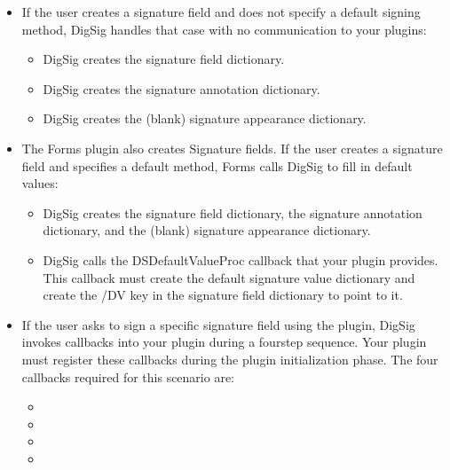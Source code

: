 \documentclass[letterpaper,12pt,english,openany,oneside]{sphinxmanual}
\begin{document}
\begin{itemize}
\item {} 
If the user creates a signature field and does not specify a default signing method, DigSig handles that case with no communication to your plugins:
\begin{itemize}
\item {} 
DigSig creates the signature field dictionary.

\item {} 
DigSig creates the signature annotation dictionary.

\item {} 
DigSig creates the (blank) signature appearance dictionary.

\end{itemize}

\item {} 
The Forms plugin also creates Signature fields. If the user creates a signature field and specifies a default method, Forms calls DigSig to fill in default values:
\begin{itemize}
\item {} 
DigSig creates the signature field dictionary, the signature annotation dictionary, and the (blank) signature appearance dictionary.

\item {} 
DigSig calls the DSDefaultValueProc callback that your plugin provides. This callback must create the default signature value dictionary and create the /DV key in the signature field dictionary to point to it.

\end{itemize}

\item {} 
If the user asks to sign a specific signature field using the plugin, DigSig invokes callbacks into your plugin during a four\sphinxhyphen{}step sequence. Your plugin must register these callbacks during the plugin initialization phase. The four callbacks required for this scenario are:
\begin{itemize}
\item {} 

\item {} 

\item {} 

\item {} 

\end{itemize}

\end{itemize}
\end{document}
